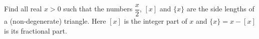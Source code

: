 Find all real $x>0$ such that the numbers $\dfrac x2$, $[x]$ and $\{x\}$ are the side lengths of a (non-degenerate) triangle. Here $[x]$ is the integer part of $x$ and $\{x\}=x-[x]$ is its fractional part.

